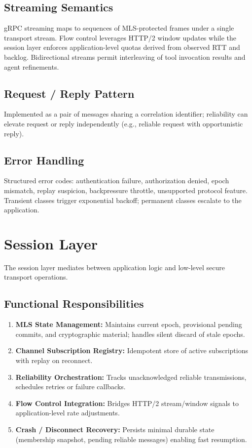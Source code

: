 \documentclass{article}
\theoremstyle{definition}
\theoremstyle{remark}
\begin{document}
\subsection{Streaming Semantics}
gRPC streaming maps to sequences of MLS-protected frames under a single transport stream. Flow control leverages HTTP/2 window updates while the session layer enforces application-level quotas derived from observed RTT and backlog. Bidirectional streams permit interleaving of tool invocation results and agent refinements.
\subsection{Request / Reply Pattern}
Implemented as a pair of messages sharing a correlation identifier; reliability can elevate request or reply independently (e.g., reliable request with opportunistic reply).
\subsection{Error Handling}
Structured error codes: authentication failure, authorization denied, epoch mismatch, replay suspicion, backpressure throttle, unsupported protocol feature. Transient classes trigger exponential backoff; permanent classes escalate to the application.

\section{Session Layer}\label{sec:session}
The session layer mediates between application logic and low-level secure transport operations.
\subsection{Functional Responsibilities}
\begin{enumerate}[leftmargin=*]
  \item \textbf{MLS State Management:} Maintains current epoch, provisional pending commits, and cryptographic material; handles silent discard of stale epochs.
  \item \textbf{Channel Subscription Registry:} Idempotent store of active subscriptions with replay on reconnect.
  \item \textbf{Reliability Orchestration:} Tracks unacknowledged reliable transmissions, schedules retries or failure callbacks.
  \item \textbf{Flow Control Integration:} Bridges HTTP/2 stream/window signals to application-level rate adjustments.
  \item \textbf{Crash / Disconnect Recovery:} Persists minimal durable state (membership snapshot, pending reliable messages) enabling fast resumption.
\end{enumerate}
\end{document}
